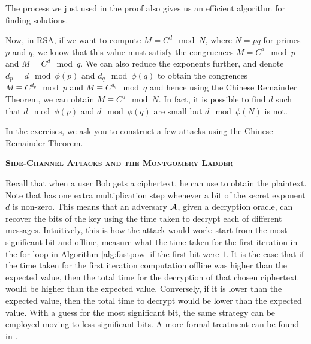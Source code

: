 The process we just used in the proof also gives us an efficient algorithm for finding solutions.

Now, in RSA, if we want to compute $M = C^d \mod N$, where $N = pq$ for primes $p$ and $q$, we know that this value must satisfy the congruences $M = C^{d}\mod p$ and $M = C^d\mod q$. We can also reduce the exponents further, and denote $d_p = d \mod \phi(p)$ and $d_q\mod \phi(q)$ to obtain the congrences $M \equiv C^{d_p}\mod p$ and $M \equiv C^{d_q}\mod q$ and hence using the Chinese Remainder Theorem, we can obtain $M\equiv C^d\mod N$. In fact, it is possible to find $d$ such that $d\mod \phi(p)$ and $d\mod \phi(q)$ are small but $d\mod \phi(N)$ is not. 
 
In the exercises, we ask you to construct a few attacks using the Chinese Remainder Theorem.


\vspace{0.25cm}
\noindent\textsc{\textbf{Side-Channel Attacks and the Montgomery Ladder}}


\newcommand{\mont}{\textnormal{MONTGOMERY}\,}

Recall that when a user Bob gets a ciphertext, he can use \fpow to obtain the plaintext. Note that \fpow has one extra multiplication step whenever a bit of the secret exponent $d$ is non-zero. This means that an adversary ${\mathcal A}$, given a decryption oracle, can recover the bits of the key using the time taken to decrypt each of different messages. Intuitively, this is how the attack would work: start from the most significant bit and offline, measure what the time taken for the first iteration in the for-loop in Algorithm \ref{alg:fastpow} if the first bit were $1$. It is the case that if the time taken for the first iteration computation offline was higher than the expected value, then the total time for the decryption of that chosen ciphertext would be higher than the expected value. Conversely, if it is lower than the expected value, then the total time to decrypt would be lower than the expected value. With a guess for the most significant bit, the same strategy can be employed moving to less significant bits. A more formal treatment can be found in \cite{boneh1999twenty}.

